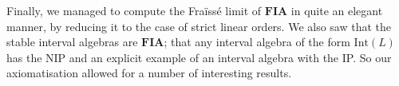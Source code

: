 \documentclass[11pt %
              ]{article}
\newcommand{\finaia}{\textbf{FIA}}
\newcommand{\inter}[1][-]{\text{Int}\left(#1\right)}
\theoremstyle{plain}
\theoremstyle{definition}
\theoremstyle{remark}
\begin{document}
Finally, we managed to compute the Fraïssé limit of $\finaia$ in quite an elegant manner, by
reducing it to the case of strict linear orders. We also saw that the stable interval algebras
are $\finaia$; that any interval algebra of the form $\inter[L]$ has the NIP and an explicit
example of an interval algebra with the IP. So our axiomatisation allowed for a number of
interesting results.

\newpage


\newpage


\end{document}
